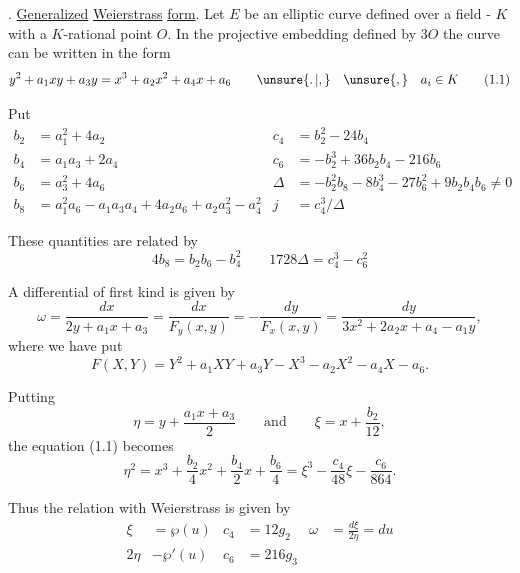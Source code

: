 \begingroup
\makeatletter\tagsleft@true{}. \uline{Generalized} \uline{Weierstrass} \uline{form}. Let $E$ be an elliptic curve defined over a field - $K$ with a $K$-rational point $O$. In the projective embedding defined by $3O$ the curve can be written in the form
\[
y^2+a_1xy+a_3y=x^3+a_2x^2+a_4x+a_6
\qquad \unsure{\ldotp|,}\quad\unsure{,}\quad a_i\in K
\tag*{(1.1)}
\]

Put
\[
\begin{aligned}
 b_2&=a_1^2+4a_2                  & c_4&=b_2^2-24b_4\\
 b_4&=a_1a_3+2a_4                  & c_6&=-b_2^3+36b_2b_4-216b_6\\
 b_6&=a_3^2+4a_6                    & \Delta&=-b_2^2b_8-8b_4^3-27b_6^2+9b_2b_4b_6\ne0\\
 b_8&=a_1^2a_6-a_1a_3a_4+4a_2a_6+a_2a_3^2-a_4^2
                                      & j&=c_4^3/\Delta
\end{aligned}
\tag*{(1.2)}
\]

These quantities are related by
\[
4b_8=b_2b_6-b_4^2 \qquad 1728\Delta=c_4^3-c_6^2
\tag*{(1.3)}
\]

A differential of first kind is given by
\[
\omega=\frac{dx}{2y+a_1x+a_3}
=\frac{dx}{F_y(x,y)}=-\frac{dy}{F_x(x,y)}
=\frac{dy}{3x^2+2a_2x+a_4-a_1y},
\tag*{(1.4)}
\]
where we have put
\[
F(X,Y)=Y^2+a_1XY+a_3Y-X^3-a_2X^2-a_4X-a_6.
\tag*{(1.5)}
\]

Putting
\[
\eta=y+\frac{a_1x+a_3}{2}\qquad\text{and}\qquad
\xi=x+\frac{b_2}{12},
\tag*{(1.6)}
\]
the equation (1.1) becomes
\[
\eta^2=x^3+\frac{b_2}{4}x^2+\frac{b_4}{2}x+\frac{b_6}{4}
=\xi^3-\frac{c_4}{48}\xi-\frac{c_6}{864}.
\tag*{(1.7)}
\]

Thus the relation with Weierstrass is given by
\[
\begin{aligned}
\xi&=\wp(u) & c_4&=12g_2 &
\omega&=\frac{d\xi}{2\eta}=du\\
2\eta&-\wp'(u) & c_6&=216g_3
\end{aligned}
\tag*{(1.8)}
\]
\endgroup

